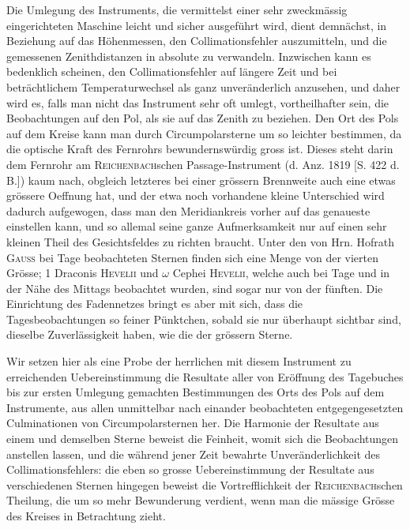 Die Umlegung des Instruments, die vermittelst einer sehr zweckmässig eingerichteten Maschine
leicht und sicher ausgeführt wird, dient demnächst, in Beziehung auf das Höhenmessen, den
Collimationsfehler auszumitteln, und die gemessenen Zenithdistanzen in absolute zu verwandeln.
Inzwischen kann es bedenklich scheinen, den Collimationsfehler auf längere Zeit und bei
beträchtlichem Temperaturwechsel als ganz unveränderlich anzusehen, und daher wird es, falls man
nicht das Instrument sehr oft umlegt, vortheilhafter sein, die Beobachtungen auf den Pol, als sie
auf das Zenith zu beziehen. Den Ort des Pols auf dem Kreise kann man durch Circumpolarsterne um so
leichter bestimmen, da die optische Kraft des Fernrohrs bewundernswürdig gross ist. Dieses steht
darin dem Fernrohr am \textsc{Reichenbach}schen Passage-Instrument (d. Anz. 1819 [S. 422 d. B.])
kaum nach, obgleich letzteres bei einer grössern Brennweite auch eine etwas grössere Oeffnung hat,
und der etwa noch vorhandene kleine Unterschied wird dadurch aufgewogen, dass man den
Meridiankreis vorher auf das genaueste einstellen kann, und so allemal seine ganze Aufmerksamkeit
nur auf einen sehr kleinen Theil des Gesichtsfeldes zu richten braucht. Unter den von Hrn. Hofrath
\textsc{Gauss} bei Tage beobachteten Sternen finden sich eine Menge von der vierten Grösse; 1 Draconis \textsc{Hevelii} und $\omega$ Cephei \textsc{Hevelii}, welche auch bei Tage und in der
Nähe des Mittags beobachtet wurden, sind sogar nur von der fünften. Die Einrichtung des
Fadennetzes bringt es aber mit sich, dass die Tagesbeobachtungen so feiner Pünktchen, sobald sie
nur überhaupt sichtbar sind, dieselbe Zuverlässigkeit haben, wie die der grössern Sterne.

\par\indent Wir setzen hier als eine Probe der herrlichen mit diesem Instrument zu erreichenden
Uebereinstimmung die Resultate aller von Eröffnung des Tagebuches bis zur ersten Umlegung gemachten
Bestimmungen des Orts des Pols auf dem Instrumente, aus allen unmittelbar nach einander beobachteten
entgegengesetzten Culminationen von Circumpolarsternen her. Die Harmonie der Resultate aus einem und
demselben Sterne beweist die Feinheit, womit sich die Beobachtungen anstellen lassen, und die
während jener Zeit bewahrte Unveränderlichkeit des Collimationsfehlers: die eben so grosse
Uebereinstimmung der Resultate aus verschiedenen Sternen hingegen beweist die Vortrefflichkeit der
\textsc{Reichenbach}schen Theilung, die um so mehr Bewunderung verdient, wenn man die mässige
Grösse des Kreises in Betrachtung zieht.

